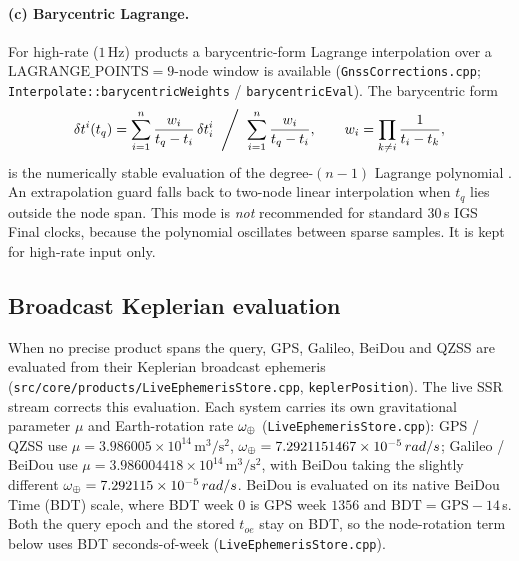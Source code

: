 \documentclass[main.tex]{subfiles}
\begin{document}
\paragraph{(c) Barycentric Lagrange.}
For high-rate ($1$\,Hz) products a barycentric-form Lagrange interpolation
over a $\mathrm{LAGRANGE\_POINTS}=9$-node window is available
(\texttt{GnssCorrections.cpp};
\texttt{Interpolate::barycentricWeights} / \texttt{barycentricEval}).  The
barycentric form
\begin{equation}
\delta t^{i}(t_q)
=
\Biggl.
\sum_{i=1}^{n}\frac{w_i}{t_q-t_i}\,\delta t^{i}_i
\;\Biggm/\;
\sum_{i=1}^{n}\frac{w_i}{t_q-t_i},
\qquad
w_i=\prod_{k\neq i}\frac{1}{t_i-t_k},
\label{eq:prod-clock-bary}
\end{equation}
is the numerically stable evaluation of the degree-$(n-1)$ Lagrange
polynomial \cite{berrut2004barycentric}.  An extrapolation guard falls
back to two-node linear interpolation when $t_q$ lies outside the node
span.  This mode is \emph{not} recommended for standard $30$\,s IGS
Final clocks, because the polynomial oscillates between sparse samples.
It is kept for high-rate input only.

\subsection{Broadcast Keplerian evaluation}\label{sec:prod-kepler}

When no precise product spans the query, GPS, Galileo, BeiDou and QZSS
are evaluated from their Keplerian broadcast ephemeris
(\texttt{src/core/products/LiveEphemerisStore.cpp},
\texttt{keplerPosition}).  The live SSR stream corrects this
evaluation.  Each system carries its own gravitational parameter $\mu$ and
Earth-rotation rate $\omega_{\oplus}$ (\texttt{LiveEphemerisStore.cpp}):
GPS / QZSS use $\mu=3.986005\times10^{14}\,\mathrm{m^3/s^2}$,
$\omega_{\oplus}=7.2921151467\times10^{-5}\,rad/s$;
Galileo / BeiDou use $\mu=3.986004418\times10^{14}\,\mathrm{m^3/s^2}$,
with BeiDou taking the slightly different
$\omega_{\oplus}=7.292115\times10^{-5}\,rad/s$.  BeiDou is evaluated
on its native BeiDou Time (BDT) scale, where BDT week $0$ is GPS week
$1356$ and $\mathrm{BDT}=\mathrm{GPS}-14$\,s.  Both the query epoch and
the stored $t_{oe}$ stay on BDT, so the node-rotation term below uses
BDT seconds-of-week (\texttt{LiveEphemerisStore.cpp}).
\end{document}
